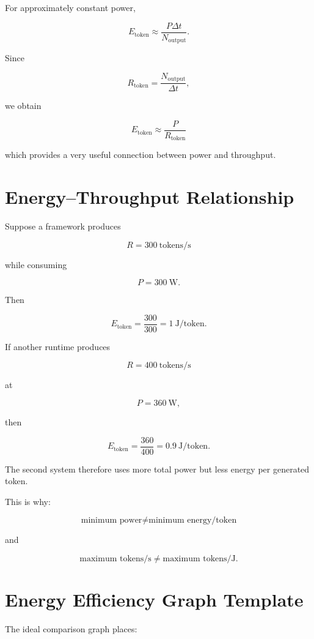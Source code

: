 \documentclass[11pt,a4paper]{article}
\newcommand{\tokps}{\mathrm{tokens/s}}
\newcommand{\jptok}{\mathrm{J/token}}
\begin{document}
For approximately constant power,

\[
E_{\mathrm{token}}
\approx
\frac{P\Delta t}
{N_{\mathrm{output}}}.
\]

Since

\[
R_{\mathrm{token}}
=
\frac{N_{\mathrm{output}}}{\Delta t},
\]

we obtain

\[
\boxed{
E_{\mathrm{token}}
\approx
\frac{P}{R_{\mathrm{token}}}
}
\]

which provides a very useful connection between power and throughput.

\section{Energy--Throughput Relationship}

Suppose a framework produces

\[
R=300\ \tokps
\]

while consuming

\[
P=300\ \mathrm{W}.
\]

Then

\[
E_{\mathrm{token}}
=
\frac{300}{300}
=
1\ \jptok.
\]

If another runtime produces

\[
R=400\ \tokps
\]

at

\[
P=360\ \mathrm{W},
\]

then

\[
E_{\mathrm{token}}
=
\frac{360}{400}
=
0.9\ \jptok.
\]

The second system therefore uses more total power but less energy
per generated token.

This is why:

\[
\boxed{
\text{minimum power}
\neq
\text{minimum energy/token}
}
\]

and

\[
\boxed{
\text{maximum tokens/s}
\neq
\text{maximum tokens/J}.
}
\]

\section{Energy Efficiency Graph Template}

The ideal comparison graph places:
\end{document}

